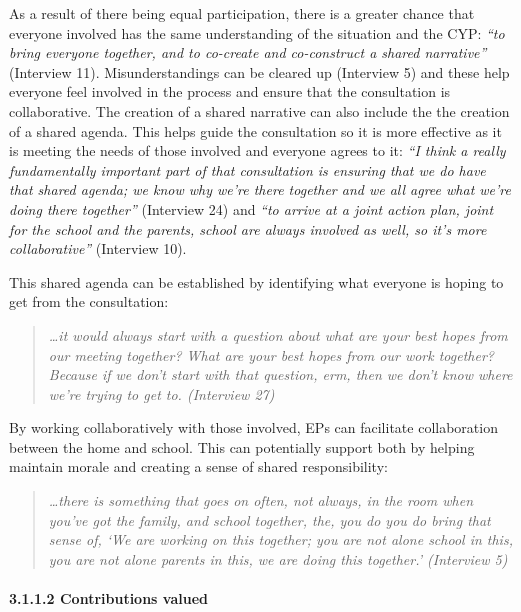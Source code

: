 \documentclass[
  english,
  man]{apa}
\let\oldparagraph\paragraph
\renewcommand{\paragraph}[1]{\oldparagraph{#1}\mbox{}}
\begin{document}
As a result of there being equal participation, there is a greater chance that everyone involved has the same understanding of the situation and the CYP: \emph{``to bring everyone together, and to co-create and co-construct a shared narrative''} (Interview 11). Misunderstandings can be cleared up (Interview 5) and these help everyone feel involved in the process and ensure that the consultation is collaborative. The creation of a shared narrative can also include the the creation of a shared agenda. This helps guide the consultation so it is more effective as it is meeting the needs of those involved and everyone agrees to it: \emph{``I think a really fundamentally important part of that consultation is ensuring that we do have that shared agenda; we know why we're there together and we all agree what we're doing there together''} (Interview 24) and \emph{``to arrive at a joint action plan, joint for the school and the parents, school are always involved as well, so it's more collaborative''} (Interview 10).

This shared agenda can be established by identifying what everyone is hoping to get from the consultation:

\begin{quote}
\emph{\ldots it would always start with a question about what are your best hopes
from our meeting together? What are your best hopes from our work
together? Because if we don't start with that question, erm, then we
don't know where we're trying to get to. (Interview 27)}
\end{quote}

By working collaboratively with those involved, EPs can facilitate collaboration between the home and school. This can potentially support both by helping maintain morale and creating a sense of shared responsibility:

\begin{quote}
\emph{\ldots there is something that goes on often, not always, in the room when
you've got the family, and school together, the, you do you do bring
that sense of, `We are working on this together; you are not alone
school in this, you are not alone parents in this, we are doing this
together.' (Interview 5)}
\end{quote}

\hypertarget{contributions-valued}{%
\paragraph{3.1.1.2 Contributions valued}\label{contributions-valued}}
\end{document}
